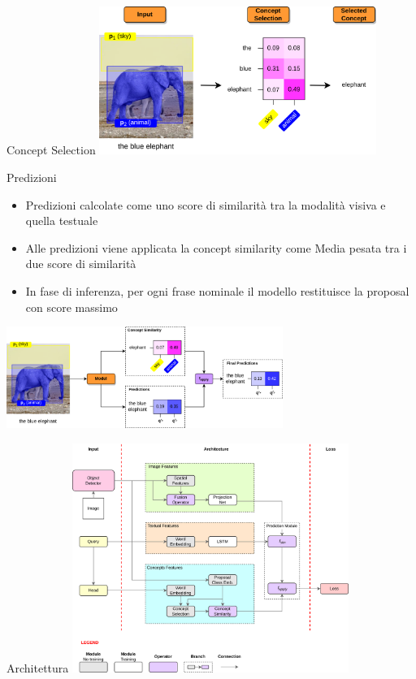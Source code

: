 \documentclass{beamer}
\begin{document}
\begin{frame}{Concept Selection}
  \centering
  \includegraphics[width=9cm]{images/concept-selection-example.png}
\end{frame}

\begin{frame}{Predizioni}
  \begin{itemize}
    \item Predizioni calcolate come uno \alert{score di similarità}
    tra la modalità visiva e quella testuale
    \item Alle predizioni viene applicata la concept similarity come
    \alert{Media pesata} tra i due score di similarità
    \item In fase di inferenza, per ogni frase nominale il modello
    restituisce la \alert{proposal con score massimo}
  \end{itemize}

  \vspace{0.5cm}

  \centering
  \includegraphics[width=9cm]{images/predictions.png}
\end{frame}

\begin{frame}{Architettura}
  \centering
  \includegraphics[width=9cm]{images/model-architecture.png}
\end{frame}
\end{document}
